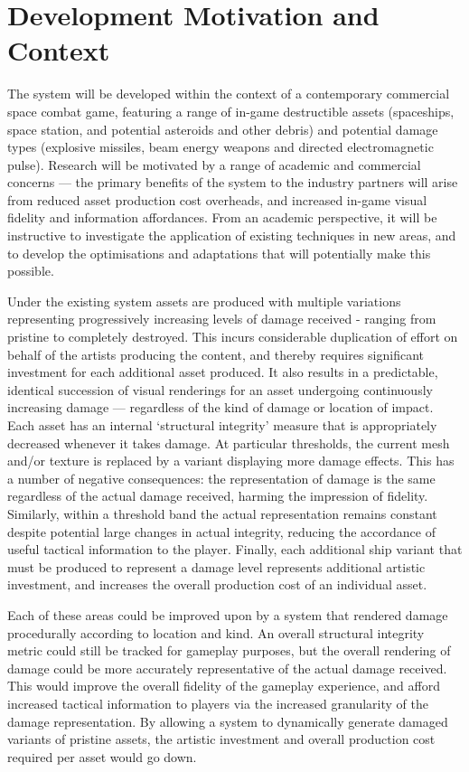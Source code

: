 \documentclass[11pt]{report}
\begin{document}
	\section{Development Motivation and Context}
		The system will be developed within the context of a contemporary commercial space combat game, featuring a range of in-game destructible assets (spaceships, space station, and potential asteroids and other debris) and potential damage types (explosive missiles, beam energy weapons and directed electromagnetic pulse). Research will be motivated by a range of academic and commercial concerns --- the primary benefits of the system to the industry partners will arise from reduced asset production cost overheads, and increased in-game visual fidelity and information affordances. From an academic perspective, it will be instructive to investigate the application of existing techniques in new areas, and to develop the optimisations and adaptations that will potentially make this possible.

		Under the existing system assets are produced with multiple variations representing progressively increasing levels of damage received - ranging from pristine to completely destroyed. This incurs considerable duplication of effort on behalf of the artists producing the content, and thereby requires significant investment for each additional asset produced. It also results in a predictable, identical succession of visual renderings for an asset undergoing continuously increasing damage --- regardless of the kind of damage or location of impact. Each asset has an internal `structural integrity' measure that is appropriately decreased whenever it takes damage. At particular thresholds, the current mesh and/or texture is replaced by a variant displaying more damage effects. This has a number of negative consequences: the representation of damage is the same regardless of the actual damage received, harming the impression of fidelity. Similarly, within a threshold band the actual representation remains constant despite potential large changes in actual integrity, reducing the accordance of useful tactical information to the player. Finally, each additional ship variant that must be produced to represent a damage level represents additional artistic investment, and increases the overall production cost of an individual asset.

		Each of these areas could be improved upon by a system that rendered damage procedurally according to location and kind. An overall structural integrity metric could still be tracked for gameplay purposes, but the overall rendering of damage could be more accurately representative of the actual damage received. This would improve the overall fidelity of the gameplay experience, and afford increased tactical information to players via the increased granularity of the damage representation. By allowing a system to dynamically generate damaged variants of pristine assets, the artistic investment and overall production cost required per asset would go down.
\end{document}
